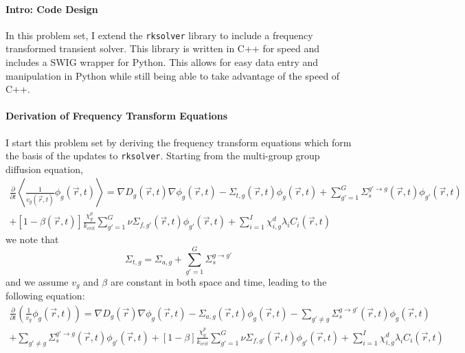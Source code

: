 \documentclass[12pt]{report}
\begin{document}
	
	
	\maketitle
	
	\paragraph{Intro: Code Design}
	In this problem set, I extend the \texttt{rksolver} library to include a frequency transformed transient solver. This library is written in C++ for speed and includes a SWIG wrapper for Python. This allows for easy data entry and manipulation in Python while still being able to take advantage of the speed of C++.
	
	\paragraph{Derivation of Frequency Transform Equations}
	I start this problem set by deriving the frequency transform equations which form the basis of the updates to \texttt{rksolver}. Starting from the multi-group group diffusion equation,
	\begin{eqnarray}
	\frac{\partial}{\partial t} \left\langle \frac{1}{v_g(\vec{r},t)} \phi_g(\vec{r},t) \right\rangle = \nabla D_g(\vec{r},t) \nabla \phi_g(\vec{r},t) - \Sigma_{t,g}(\vec{r},t) \phi_g(\vec{r},t) + \sum_{g'=1}^{G} \Sigma_{s}^{g'\rightarrow g} (\vec{r},t) \phi_{g'}(\vec{r},t) \nonumber \\ 
	+ \left[ 1- \beta(\vec{r},t) \right] \frac{\chi_g^p}{k_{crit}} \sum_{g'=1}^{G} \nu \Sigma_{f,g'}(\vec{r},t) \phi_{g'}(\vec{r},t) + \sum_{i=1}^{I} \chi_{i,g}^d \lambda_i C_i(\vec{r},t) \nonumber
	\end{eqnarray}
	we note that 
	\begin{equation}
	\Sigma_{t,g} = \Sigma_{a,g} + \sum_{g'= 1}^G \Sigma_{s}^{g\rightarrow g'} \nonumber
	\end{equation}
	and we assume $v_g$ and $\beta$ are constant in both space and time, leading to the following equation:
	\begin{eqnarray}
	\frac{\partial}{\partial t} \left( \frac{1}{v_g} \phi_g(\vec{r},t) \right) = \nabla D_g(\vec{r}) \nabla \phi_g(\vec{r},t)  - \Sigma_{a,g}(\vec{r},t) \phi_g(\vec{r},t) - \sum_{g'\neq g} \Sigma_{s}^{g\rightarrow g'} (\vec{r},t) \phi_{g}(\vec{r},t)  \nonumber \\  + \sum_{g' \neq g} \Sigma_{s}^{g'\rightarrow g} (\vec{r},t) \phi_{g'}(\vec{r},t)
	+ \left[ 1- \beta \right] \frac{\chi_g^p}{k_{crit}} \sum_{g'=1}^{G} \nu \Sigma_{f,g'}(\vec{r},t) \phi_{g'}(\vec{r},t) + \sum_{i=1}^{I} \chi_{i,g}^d \lambda_i C_i(\vec{r},t) \nonumber
	\end{eqnarray}
\end{document}
